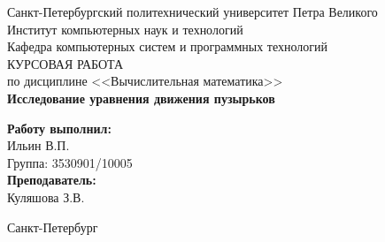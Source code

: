 \begin{titlepage}
		\begin{center}
			\large Санкт-Петербургский политехнический университет Петра Великого\\
			\large Институт компьютерных наук и технологий \\
			\large Кафедра компьютерных систем и программных технологий\\[6cm]


		\huge КУРСОВАЯ РАБОТА\\[0.5cm]
			\large по дисциплине <<Вычислительная математика>>\\[0.1cm]
			\large\textbf{Исследование уравнения движения пузырьков}\\[5cm]
		\end{center}


		\begin{flushright}
			\begin{minipage}{0.25\textwidth}
				\begin{flushleft}

					\large\textbf{Работу выполнил:}\\
					\large Ильин В.П.\\
					\large {Группа:} 3530901/10005\\

					\large \textbf{Преподаватель:}\\
					\large Куляшова З.В.

				\end{flushleft}
			\end{minipage}
		\end{flushright}

		\vfill

		\begin{center}
			\large Санкт-Петербург\\
			\large \the\year
		\end{center}
	\end{titlepage}

	\vfill
	\newpage
